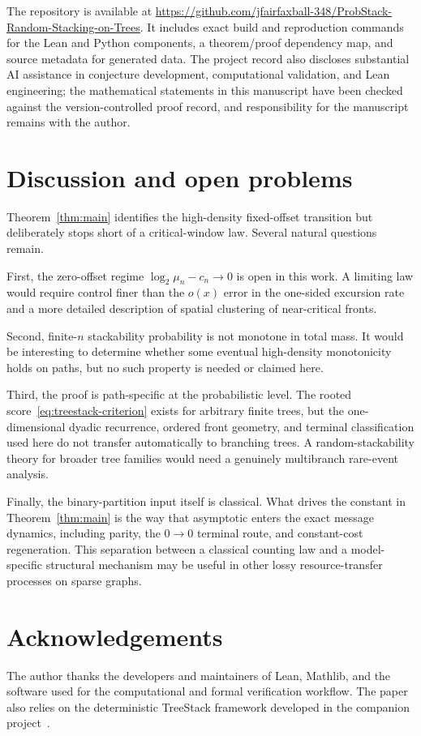 \documentclass[11pt]{article}
\begin{document}
The repository is available at
\url{https://github.com/jfairfaxball-348/ProbStack-Random-Stacking-on-Trees}.
It includes exact build and reproduction commands for the Lean and Python
components, a theorem/proof dependency map, and source metadata for generated
data.  The project record also discloses substantial AI assistance
in conjecture development, computational validation, and Lean engineering;
the mathematical statements in this manuscript have been checked against the
version-controlled proof record, and responsibility for the manuscript remains
with the author.

\section{Discussion and open problems}\label{sec:discussion}

Theorem~\ref{thm:main} identifies the high-density fixed-offset transition but
deliberately stops short of a critical-window law.  Several natural questions
remain.

First, the zero-offset regime
$\log_2\mu_n-c_n\to0$ is open in this work.  A limiting law would require
control finer than the $o(x)$ error in the one-sided excursion rate and a more
detailed description of spatial clustering of near-critical fronts.

Second, finite-$n$ stackability probability is not monotone in total mass.  It
would be interesting to determine whether some eventual high-density
monotonicity holds on paths, but no such property is needed or claimed here.

Third, the proof is path-specific at the probabilistic level.  The rooted
score~\eqref{eq:treestack-criterion} exists for arbitrary finite trees, but the
one-dimensional dyadic recurrence, ordered front geometry, and terminal
classification used here do not transfer automatically to branching trees.
A random-stackability theory for broader tree families would need a genuinely
multibranch rare-event analysis.

Finally, the binary-partition input itself is classical.  What drives the
constant in Theorem~\ref{thm:main} is the way that asymptotic enters the exact
message dynamics, including parity, the $0\to0$ terminal route, and
constant-cost regeneration.  This separation between a classical counting
law and a model-specific structural mechanism may be useful in other lossy
resource-transfer processes on sparse graphs.

\section*{Acknowledgements}
The author thanks the developers and maintainers of Lean, Mathlib, and the
software used for the computational and formal verification workflow.  The
paper also relies on the deterministic TreeStack framework developed in the
companion project~\cite{TreeStack2026}.
\end{document}
